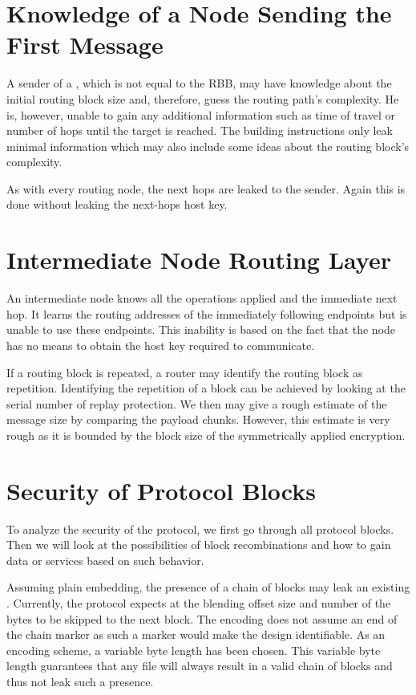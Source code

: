 \section{Knowledge of a Node Sending the First Message}
A sender of a \VortexMessage{}, which is not equal to the RBB, may have knowledge about the initial routing block size and, therefore, guess the routing path's complexity. He is, however, unable to gain any additional information such as time of travel or number of hops until the target is reached. The building instructions  only leak minimal information which may also include some ideas about the routing block's complexity. 

As with every routing node, the next hops are leaked to the sender. Again this is done without leaking the next-hops host key.

\section{Intermediate Node Routing Layer}
An intermediate node knows all the operations applied and the immediate next hop. It learns the routing addresses of the immediately following endpoints but is unable to use these endpoints. This inability is based on the fact that the node has no means to obtain the host key required to communicate.

If a routing block is repeated, a router may identify the routing block as repetition. Identifying the repetition of a block can be achieved by looking at the serial number of replay protection. We then may give a rough estimate of the message size by comparing the payload chunks. However, this estimate is very rough as it is bounded by the block size of the symmetrically applied encryption.

\section{Security of Protocol Blocks}
To analyze the security of the protocol, we first go through all protocol blocks. Then we will look at the possibilities of block recombinations and how to gain data or services based on such behavior. 

Assuming plain embedding, the presence of a chain of blocks may leak an existing \VortexMessage. Currently, the protocol expects at the blending offset size and number of the bytes to be skipped to the next block. The encoding does not assume an end of the chain marker as such a marker would make the design identifiable. As an encoding scheme, a variable byte length has been chosen. This variable byte length guarantees that any file will always result in a valid chain of blocks and thus not leak such a presence.

